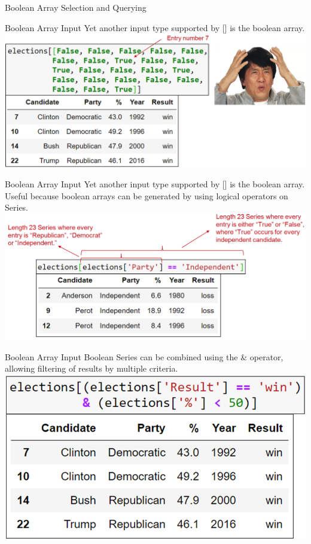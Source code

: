 \documentclass[aspectratio=169]{../latex_main/tntbeamer}  %
\begin{document}
	
	\begin{frame}{Boolean Array Selection and Querying}
	    
	\end{frame}
	
	
	\begin{frame}{Boolean Array Input}
	    Yet another input type supported by [] is the boolean array.\\
	    \includegraphics[scale=.35]{Bild18}
	\end{frame}
	
	
	\begin{frame}{Boolean Array Input}
	   Yet another input type supported by [] is the boolean array. Useful because boolean arrays can be generated by using logical operators on Series.
	    \includegraphics[scale=.35]{Bild19}
	\end{frame}
	
	
	\begin{frame}{Boolean Array Input}
	    \centering
	   Boolean Series can be combined using the & operator, allowing filtering of results by multiple criteria.
	    \includegraphics[scale=.5]{Bild20}
	\end{frame}
	
\end{document}
